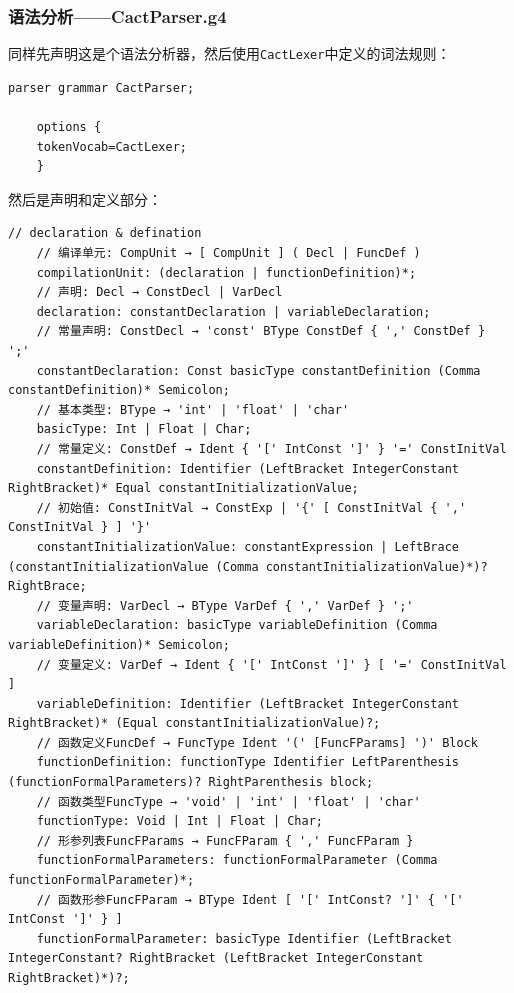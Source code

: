 \documentclass[UTF8]{report}
\begin{document}
\subsubsection{语法分析——CactParser.g4}

同样先声明这是个语法分析器，然后使用\texttt{CactLexer}中定义的词法规则：

\begin{lstlisting}[language=antlr]
    parser grammar CactParser;

    options {
    tokenVocab=CactLexer;
    }
\end{lstlisting}

然后是声明和定义部分：

\begin{lstlisting}[language=antlr]
    // declaration & defination
    // 编译单元: CompUnit → [ CompUnit ] ( Decl | FuncDef )
    compilationUnit: (declaration | functionDefinition)*;
    // 声明: Decl → ConstDecl | VarDecl
    declaration: constantDeclaration | variableDeclaration;
    // 常量声明: ConstDecl → 'const' BType ConstDef { ',' ConstDef } ';'
    constantDeclaration: Const basicType constantDefinition (Comma constantDefinition)* Semicolon;
    // 基本类型: BType → 'int' | 'float' | 'char'
    basicType: Int | Float | Char;
    // 常量定义: ConstDef → Ident { '[' IntConst ']' } '=' ConstInitVal
    constantDefinition: Identifier (LeftBracket IntegerConstant RightBracket)* Equal constantInitializationValue;
    // 初始值: ConstInitVal → ConstExp | '{' [ ConstInitVal { ',' ConstInitVal } ] '}'
    constantInitializationValue: constantExpression | LeftBrace (constantInitializationValue (Comma constantInitializationValue)*)? RightBrace;
    // 变量声明: VarDecl → BType VarDef { ',' VarDef } ';'
    variableDeclaration: basicType variableDefinition (Comma variableDefinition)* Semicolon;
    // 变量定义: VarDef → Ident { '[' IntConst ']' } [ '=' ConstInitVal ]
    variableDefinition: Identifier (LeftBracket IntegerConstant RightBracket)* (Equal constantInitializationValue)?;
    // 函数定义FuncDef → FuncType Ident '(' [FuncFParams] ')' Block
    functionDefinition: functionType Identifier LeftParenthesis (functionFormalParameters)? RightParenthesis block;
    // 函数类型FuncType → 'void' | 'int' | 'float' | 'char'
    functionType: Void | Int | Float | Char;
    // 形参列表FuncFParams → FuncFParam { ',' FuncFParam }
    functionFormalParameters: functionFormalParameter (Comma functionFormalParameter)*;
    // 函数形参FuncFParam → BType Ident [ '[' IntConst? ']' { '[' IntConst ']' } ]
    functionFormalParameter: basicType Identifier (LeftBracket IntegerConstant? RightBracket (LeftBracket IntegerConstant RightBracket)*)?;
\end{lstlisting}
\end{document}
